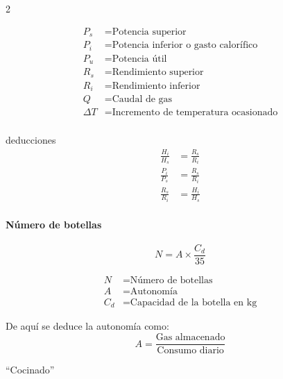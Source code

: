 \documentclass[11pt]{article}
\begin{document}
\begin{multicols*}{2}
    \begin{minipage}{\linewidth}
        \begin{align*}
            P_s &= \text{Potencia superior} \\
            P_i &= \text{Potencia inferior o gasto calorífico} \\
            P_u &= \text{Potencia útil} \\
            R_s &= \text{Rendimiento superior} \\
            R_i &= \text{Rendimiento inferior} \\
            Q &= \text{Caudal de gas} \\
            \Delta T &= \text{Incremento de temperatura ocasionado} \\
        \end{align*}
    \end{minipage}

    deducciones
    \begin{align*}
        \frac{H_i}{H_s} & = \frac{R_s}{R_i} \\
        \frac{P_i}{P_s} & = \frac{R_s}{R_i} \\
        \frac{R_s}{R_i} & = \frac{H_i}{H_s}
    \end{align*}

    \paragraph{Número de botellas}

    \begin{equation*}
        N = A \times \frac{C_d}{35}
    \end{equation*}

    \begin{minipage}{\linewidth}
        \begin{align*}
            N &= \text{Número de botellas} \\
            A &= \text{Autonomía} \\
            C_d &= \text{Capacidad de la botella en kg}
        \end{align*}
    \end{minipage}

    De aquí se deduce la autonomía como:
    \begin{equation*}
        A = \frac{\text{Gas almacenado}}{\text{Consumo diario}}
    \end{equation*}

    ``Cocinado''


\end{multicols*}
\end{document}
